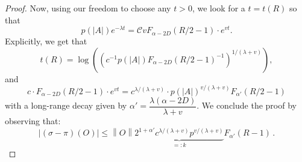 \documentclass[10pt,a4paper]{amsart}
\newcommand{\abs}[1]{\left \vert#1\right\vert}
\newcommand{\norm}[1]{\left\lVert#1\right\rVert}
\begin{document}
\begin{proof}
    Now, using our freedom to choose any $t>0$, we look for a $t=t(R)$ so that\[p(\abs{A}) e^{-\lambda t}=\mathcal{C}v F_{\alpha-2D}(R/2-1) \cdot e^{vt}.\] Explicitly, we get that
    \begin{equation}
        t(R)=\log \left(  (c^{-1}p(\abs{A})F_{\alpha-2D}(R/2-1)^{-1})^{1/(\lambda+v)}  \right),
    \end{equation}
    and
    \begin{equation}
        c\cdot F_{\alpha-2D}(R/2-1) \cdot e^{vt}=c^{\lambda/(\lambda+v)}\cdot p(\abs{A})^{v/(\lambda +v)} F_{\alpha '}(R/2-1)
    \end{equation}
    with a long-range decay given by $\alpha'=\dfrac{\lambda(\alpha-2D)}{\lambda +v}$.
    We  conclude the proof by observing that:
    \begin{equation}
         \abs{(\sigma-\pi)(O)}\leq \norm{O} \underbrace{ 2^{1+\alpha'}c^{\lambda/(\lambda+v)} p^{v/(\lambda +v)} }_{=: k}F_{\alpha '}(R-1)\,.
    \end{equation}
\end{proof}
\end{document}
